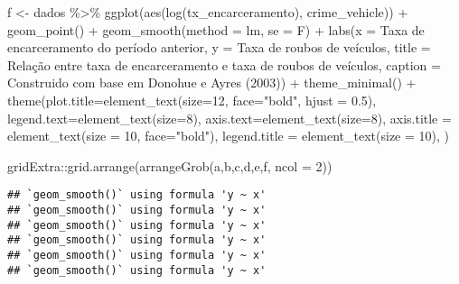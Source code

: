 \documentclass[
]{article}
\newenvironment{Shaded}{\begin{snugshade}}{\end{snugshade}}
\newcommand{\AttributeTok}[1]{\textcolor[rgb]{0.77,0.63,0.00}{#1}}
\newcommand{\DecValTok}[1]{\textcolor[rgb]{0.00,0.00,0.81}{#1}}
\newcommand{\FloatTok}[1]{\textcolor[rgb]{0.00,0.00,0.81}{#1}}
\newcommand{\FunctionTok}[1]{\textcolor[rgb]{0.00,0.00,0.00}{#1}}
\newcommand{\NormalTok}[1]{#1}
\newcommand{\OtherTok}[1]{\textcolor[rgb]{0.56,0.35,0.01}{#1}}
\newcommand{\SpecialCharTok}[1]{\textcolor[rgb]{0.00,0.00,0.00}{#1}}
\newcommand{\StringTok}[1]{\textcolor[rgb]{0.31,0.60,0.02}{#1}}
\begin{document}
\begin{Shaded}
\begin{Highlighting}[]
\NormalTok{f }\OtherTok{\textless{}{-}}\NormalTok{ dados }\SpecialCharTok{\%\textgreater{}\%} 
  \FunctionTok{ggplot}\NormalTok{(}\FunctionTok{aes}\NormalTok{(}\FunctionTok{log}\NormalTok{(tx\_encarceramento), crime\_vehicle)) }\SpecialCharTok{+}
  \FunctionTok{geom\_point}\NormalTok{() }\SpecialCharTok{+} 
  \FunctionTok{geom\_smooth}\NormalTok{(}\AttributeTok{method =} \StringTok{\textquotesingle{}lm\textquotesingle{}}\NormalTok{, }\AttributeTok{se =}\NormalTok{ F) }\SpecialCharTok{+}
  \FunctionTok{labs}\NormalTok{(}\AttributeTok{x =} \StringTok{\textquotesingle{}Taxa de encarceramento do período anterior\textquotesingle{}}\NormalTok{,}
       \AttributeTok{y =} \StringTok{\textquotesingle{}Taxa de roubos de veículos\textquotesingle{}}\NormalTok{,}
       \AttributeTok{title =} \StringTok{\textquotesingle{}Relação entre taxa de encarceramento e taxa de roubos de veículos\textquotesingle{}}\NormalTok{,}
       \AttributeTok{caption =} \StringTok{\textquotesingle{}Construido com base em Donohue e Ayres (2003)\textquotesingle{}}\NormalTok{) }\SpecialCharTok{+} 
  \FunctionTok{theme\_minimal}\NormalTok{() }\SpecialCharTok{+}
  \FunctionTok{theme}\NormalTok{(}\AttributeTok{plot.title=}\FunctionTok{element\_text}\NormalTok{(}\AttributeTok{size=}\DecValTok{12}\NormalTok{, }\AttributeTok{face=}\StringTok{"bold"}\NormalTok{, }\AttributeTok{hjust =} \FloatTok{0.5}\NormalTok{),}
        \AttributeTok{legend.text=}\FunctionTok{element\_text}\NormalTok{(}\AttributeTok{size=}\DecValTok{8}\NormalTok{),}
        \AttributeTok{axis.text=}\FunctionTok{element\_text}\NormalTok{(}\AttributeTok{size=}\DecValTok{8}\NormalTok{),}
        \AttributeTok{axis.title =} \FunctionTok{element\_text}\NormalTok{(}\AttributeTok{size =} \DecValTok{10}\NormalTok{, }\AttributeTok{face=}\StringTok{"bold"}\NormalTok{),}
        \AttributeTok{legend.title =} \FunctionTok{element\_text}\NormalTok{(}\AttributeTok{size =} \DecValTok{10}\NormalTok{),}
\NormalTok{        )}

\NormalTok{gridExtra}\SpecialCharTok{::}\FunctionTok{grid.arrange}\NormalTok{(}\FunctionTok{arrangeGrob}\NormalTok{(a,b,c,d,e,f, }\AttributeTok{ncol =} \DecValTok{2}\NormalTok{)) }
\end{Highlighting}
\end{Shaded}

\begin{verbatim}
## `geom_smooth()` using formula 'y ~ x'
## `geom_smooth()` using formula 'y ~ x'
## `geom_smooth()` using formula 'y ~ x'
## `geom_smooth()` using formula 'y ~ x'
## `geom_smooth()` using formula 'y ~ x'
## `geom_smooth()` using formula 'y ~ x'
\end{verbatim}
\end{document}
